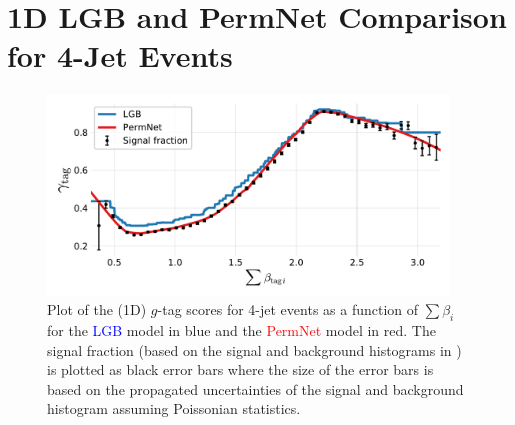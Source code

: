 \FloatBarrier
\section{1D LGB and PermNet Comparison for 4-Jet Events}

\begin{figure}
  \includegraphics[width=0.95\textwidth, trim=10 10 10 10, clip]{figures/quarks/gtag_sum_models_njet=4-down_sample=1.00-ML_vars=vertex-selection=b-ejet_min=4-n_iter_RS_lgb=99-n_iter_RS_xgb=9-cdot_cut=0.90-version=19.pdf}
  \vspace{-0.7cm}
  \caption[1D Sum Models Predictions and Signal Fraction for 4-jets events]
          {Plot of the (1D) $g$-tag scores for 4-jet events as a function of $\sum \beta_i$ for the \textcolor{blue}{LGB} model in blue and the \textcolor{red}{PermNet} model in red. The signal fraction (based on the signal and background histograms in ) is plotted as black error bars where the size of the error bars is based on the propagated uncertainties of the signal and background histogram assuming Poissonian statistics. } 
\end{figure}
\vspace{5cm}
